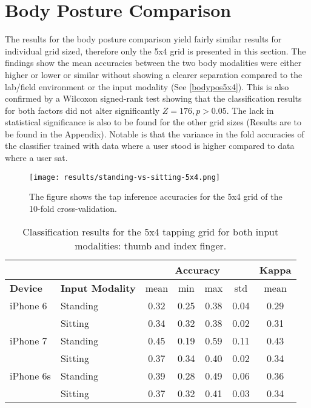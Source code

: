 \section{Body Posture Comparison}
The results for the body posture comparison yield fairly similar results for individual grid sized, therefore only the 5x4 grid is presented in this section. The findings show the mean accuracies between the two body modalities were either higher or lower or similar without showing a clearer separation compared to the lab/field environment or the input modality (See \ref{bodypos5x4}). This is also confirmed by a Wilcoxon signed-rank test showing that the classification results for both factors did not alter significantly $Z = 176, p > 0.05$. The lack in statistical significance is also to be found for the other grid sizes (Results are to be found in the Appendix). Notable is that the variance in the fold accuracies of the classifier trained with data where a user stood is higher compared to data where a user sat.

\begin{figure}[h!]
  \centering
  \texttt{[image: results/standing-vs-sitting-5x4.png]}
  \caption{The figure shows the tap inference accuracies for the 5x4 grid of the 10-fold cross-validation.} \label{fig:bodypos5x4}
\end{figure}

\begin{table}[h!]
  \centering
\begin{tabular}{|l|l|c|c|c|c|c|}
  \cline{3-7}
  \multicolumn{2}{c}{} & \multicolumn{4}{|c|}{\textbf{Accuracy}} & \textbf{Kappa} \\
  \hline
  \textbf{Device} & \textbf{Input Modality} & mean &   min &   max  & std &  mean \\
  \hline
  iPhone 6 & Standing &      0.32 &     0.25 &     0.38 &     0.04 &        0.29 \\
  & Sitting &      0.34 &     0.32 &     0.38 &     0.02 &        0.31 \\
  \hline
iPhone 7 & Standing &      0.45 &     0.19 &     0.59 &     0.11 &        0.43 \\
  & Sitting &      0.37 &     0.34 &     0.40 &     0.02 &        0.34 \\
  \hline
iPhone 6s & Standing &      0.39 &     0.28 &     0.49 &     0.06 &        0.36 \\
  & Sitting &      0.37 &     0.32 &     0.41 &     0.03 &        0.34 \\
  \hline
\end{tabular}
  \caption{Classification results for the 5x4 tapping grid for both input modalities: thumb and index finger.}
\end{table}


